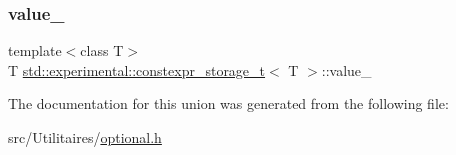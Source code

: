 \mbox{\label{unionstd_1_1experimental_1_1constexpr__storage__t_ab0f056b5b1e7bfde0dc04629fd0b9ade}} 
\subsubsection{\texorpdfstring{value\+\_\+}{value\_}}
{\footnotesize\ttfamily template$<$class T$>$ \\
T \mbox{\hyperlink{unionstd_1_1experimental_1_1constexpr__storage__t}{std\+::experimental\+::constexpr\+\_\+storage\+\_\+t}}$<$ T $>$\+::value\+\_\+}



The documentation for this union was generated from the following file\+:\begin{DoxyCompactItemize}
\item 
src/\+Utilitaires/\mbox{\hyperlink{optional_8h}{optional.\+h}}\end{DoxyCompactItemize}
